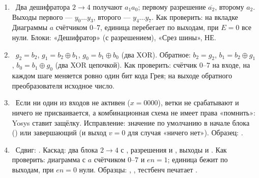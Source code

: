 \begin{enumerate}
  \item {}~Два дешифратора $2\to4$ получают $a_1a_0$; первому разрешение $\overline{a_2}$, второму $a_2$. Выходы первого --- $y_0\ldots y_3$, второго --- $y_4\ldots y_7$. Как проверить: на вкладке Диаграммы $a$ счётчиком $0$--$7$, единица перебегает по выходам, при $E=0$ все нули. Блоки: «Дешифратор» (с разрешением), «Срез шины», НЕ.
  \item {}~$g_2=b_2$, $g_1=b_2\oplus b_1$, $g_0=b_1\oplus b_0$ (два XOR). Обратное: $b_2=g_2$, $b_1=b_2\oplus g_1$, $b_0=b_1\oplus g_0$ (два XOR цепочкой). Как проверить: счётчик $0$--$7$ на входе, на каждом шаге меняется ровно один бит кода Грея; на выходе обратного преобразователя исходное число.
  \item {}~Если ни один из входов не активен ($x=0000$), ветки не срабатывают и  ничего не присваивается, а комбинационная схема не имеет права «помнить»: Yosys ставит защёлку. Исправление: значение по умолчанию в начале блока () или завершающий  (и выход $v=0$ для случая «ничего нет»). Образец: .
  \item {}~Сдвиг: . Каскад: два блока $2\to4$ с , разрешения  и , выходы  и . Как проверить: диаграмма с $a$ счётчиком $0$--$7$ и $en=1$; единица бежит по выходам, при $en=0$ нули. Образцы: , , тестбенч  печатает .
\end{enumerate}

